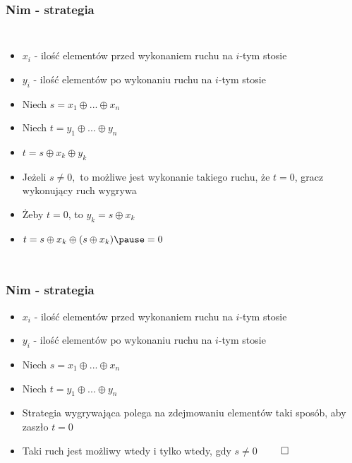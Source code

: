 \documentclass[polish,envcountsect,10pt]{beamer}
\begin{document}
                \begin{frame}
                    \frametitle{Nim - strategia}
                    \begin{columns}
                            \begin{itemize}
                                \item<1-> $x_i$ - ilość elementów przed wykonaniem ruchu na $i$-tym stosie
                                \item<1-> $y_i$ - ilość elementów po wykonaniu ruchu na $i$-tym stosie
                                \item<1-> Niech $s = x_1 \oplus ... \oplus x_n$
                                \item<1-> Niech $t = y_1 \oplus ... \oplus y_n$
                                \item<1-> $t = s \oplus x_k \oplus y_k$
                                \item<2-> Jeżeli $s \neq 0,$ to możliwe jest wykonanie takiego ruchu, że $t = 0$, gracz wykonujący ruch wygrywa
                                \item<3-> Żeby $t = 0$, to $y_k = s \oplus x_k$
                                \item<4-> $t = s \oplus x_k \oplus (s \oplus x_k) \pause = 0$
                            \end{itemize}
                \end{columns}
                \end{frame}
                \begin{frame}
                    \frametitle{Nim - strategia}
                    \begin{itemize}
                        \item<1-> $x_i$ - ilość elementów przed wykonaniem ruchu na $i$-tym stosie
                        \item<1-> $y_i$ - ilość elementów po wykonaniu ruchu na $i$-tym stosie
                        \item<1-> Niech $s = x_1 \oplus ... \oplus x_n$
                        \item<1-> Niech $t = y_1 \oplus ... \oplus y_n$
                        \item<2-> Strategia wygrywająca polega na zdejmowaniu elementów taki sposób, aby zaszło $t = 0$
                        \item<3-> Taki ruch jest możliwy wtedy i tylko wtedy, gdy $s \neq 0$ \pause $\qed$
                    \end{itemize}
                \end{frame}
\end{document}
